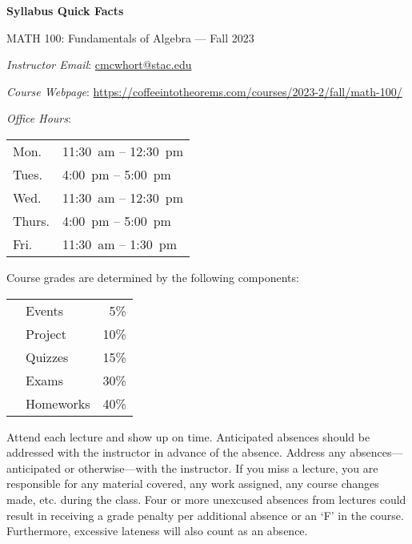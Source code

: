 \documentclass[11pt,letterpaper]{article}
\begin{document}
\begin{center} 
\bfseries
\color{stacred}
\LARGE Syllabus Quick Facts \par\vspace{0.2\baselineskip}
\Large MATH 100: Fundamentals of Algebra --- Fall 2023 
\end{center} \pspace


\hspace{0.53cm} {\itshape Instructor Email}: \href{mailto:cmcwhort@stac.edu}{cmcwhort@stac.edu} \par
\hspace{0.53cm} {\itshape Course Webpage}: \href{https://coffeeintotheorems.com/courses/2023-2/fall/math-100/}{https://coffeeintotheorems.com/courses/2023-2/fall/math-100/} \par
\hspace{0.53cm} {\itshape Office Hours}: 	\par \vspace{-0.3cm}
	\begin{table}[!ht]
	\centering
	\begin{tabular}{l || l}
	Mon. & 11:30~am -- 12:30~pm \\
	Tues. & 4:00~pm -- 5:00~pm \\
	Wed. & 11:30~am -- 12:30~pm \\
	Thurs. & 4:00~pm -- 5:00~pm \\
	Fri. & 11:30~am -- 1:30~pm
	\end{tabular}
	\end{table}


Course grades are determined by the following components: \par \vspace{-0.3cm}
	\begin{table}[!ht]
        \begin{tabular}{clr}
	& Events & 5\% \\
	& Project & 10\% \\
	& Quizzes & 15\% \\
	& Exams & 30\% \\
	& Homeworks & 40\% 
        \end{tabular} 
        \end{table}


Attend each lecture and show up on time. Anticipated absences should be addressed with the instructor in advance of the absence. Address any absences---anticipated or otherwise---with the instructor. If you miss a lecture, you are responsible for any material covered, any work assigned, any course changes made, etc. during the class. Four or more unexcused absences from lectures could result in receiving a grade penalty per additional absence or an `F' in the course. Furthermore, excessive lateness will also count as an absence. \pspace
\end{document}
